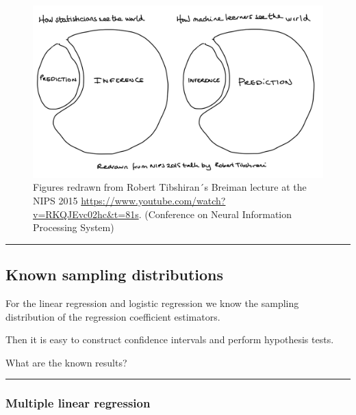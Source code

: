 \documentclass[
  letterpaper,
  DIV=11,
  numbers=noendperiod]{scrartcl}
\begin{document}
\begin{figure}

{\centering \includegraphics[width=1\textwidth,height=\textheight]{./StatsvsMLPredInf.jpg}

}

\caption{Figures redrawn from Robert Tibshiran´s Breiman lecture at the
NIPS 2015 \url{https://www.youtube.com/watch?v=RKQJEvc02hc\&t=81s}.
(Conference on Neural Information Processing System)}

\end{figure}

\begin{center}\rule{0.5\linewidth}{0.5pt}\end{center}

\hypertarget{known-sampling-distributions}{%
\subsection{Known sampling
distributions}\label{known-sampling-distributions}}

For the linear regression and logistic regression we know the sampling
distribution of the regression coefficient estimators.

Then it is easy to construct confidence intervals and perform hypothesis
tests.

What are the known results?

\begin{center}\rule{0.5\linewidth}{0.5pt}\end{center}

\hypertarget{multiple-linear-regression}{%
\subsubsection{Multiple linear
regression}\label{multiple-linear-regression}}
\end{document}
